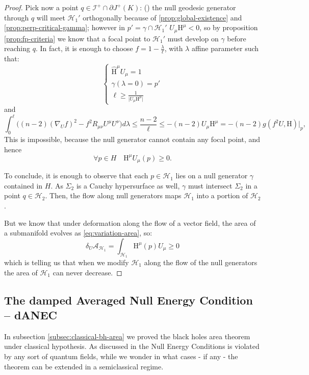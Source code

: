 \begin{proof}
	Pick now a point \(q \in \mathscr{I}^+ \cap \partial J^+(K)\):  ()
	the null geodesic generator through \(q\) will meet \(\mathscr{H}_1'\) orthogonally because of \ref{prop:global-existence} and \ref{prop:perp-critical-gamma}; however in \(p' = \gamma \cap \mathscr{H}_1'\) \(U_{\mu}\mathrm{H}^{\mu} < 0\), so by proposition \ref{prop:fp-criteria} we know that a focal point to \(\mathscr{H}_1'\) must develop on \(\gamma\) before reaching \(q\). In fact, it is enough to choose \(f = 1 - \frac{\lambda}{\ell}\), with \(\lambda\) affine parameter such that:
	\[
	\begin{cases}
	\hat{\mathrm{H}}^{\mu}U_{\mu} = 1 \\
	\gamma(\lambda = 0) = p' \\
	\ell \ge  \frac{1}{\vert U_{\mu}\mathrm{H}^{\mu} \vert}
	\end{cases}
	\]
	and 
	\[
	\int_{0}^{\ell} \big((n -2)(\nabla_Uf)^2 - f^2R_{\mu\nu}U^{\mu}U^{\nu} \big)d\lambda\le 
	\frac{n -2}{\ell} \le -(n -2) U_{\mu} \mathrm{H}^{\mu} =
	-(n -2) g(f^2 U, \mathrm{H})\Big\vert_{p},
	\]
	This is impossible, because the null generator cannot contain any focal point, and hence 
	\[
	\forall p \in H \quad \mathrm{H}^{\mu}U_{\mu}(p) \ge 0.
	\]
		
	To conclude, it is enough to observe that each \(p\in \mathscr{H}_1\) lies on a null generator \(\gamma\) contained in \(H\). As \(\Sigma_2\) is a Cauchy hypersurface as well, \(\gamma\) must intersect \(\Sigma_2\) in a point \(q \in \mathscr{H}_2\). Then, the flow along null generators maps \(\mathscr{H}_1\) into a portion of \(\mathscr{H}_2\).
	
	But we know that under deformation along the flow of a vector field, the area of a submanifold evolves as \ref{eq:variation-area}, so:
	\begin{equation*}
		\delta_U\mathcal{A}_{\mathscr{H}_1} = \int_{\mathscr{H}_1} \mathrm{H}^{\mu}(p)U_{\mu} \ge 0
	\end{equation*}
	which is telling us that when we modify \(\mathscr{H}_1\) along the flow of the null generators the area of \(\mathscr{H}_1\) can never decrease.
\end{proof}

\subsection{The damped Averaged Null Energy Condition -- dANEC}
In subsection \ref{subsec:classical-bh-area} we proved the black holes area theorem under classical hypothesis. As discussed in %
the Null Energy Conditions is violated by any sort of quantum fields, while we wonder in what cases - if any - the theorem can be extended in a semiclassical regime.


